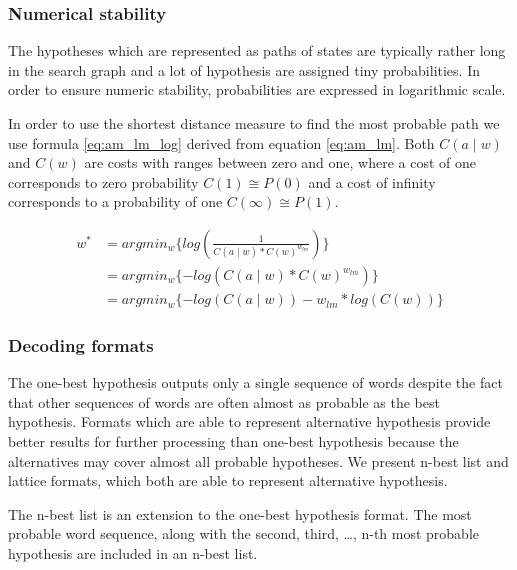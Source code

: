 \subsubsection*{Numerical stability}
The hypotheses which are represented as paths of states are typically rather long in the search graph and a lot of hypothesis are assigned tiny probabilities. In order to ensure numeric stability, probabilities are expressed in logarithmic scale. 


In order to use the shortest distance measure to find the most probable path we use formula \ref{eq:am_lm_log} derived from equation \ref{eq:am_lm}. Both $C(a \mid w)$ and $C(w)$ are costs with ranges between zero and one, where a cost of one corresponds to zero probability $C(1) \cong P(0)$ and a cost of infinity corresponds to a probability of one $C(\infty) \cong P(1)$.

\begin{equation}\label{eq:am_lm_log}
  \begin{split}
    w^* &= argmin_{w}\{log(\frac{1}{C(a \mid w) * C(w)^{w_{lm}}})\} \\
    &= argmin_{w}\{-log(C(a \mid w) * C(w)^{w_{lm}})\} \\
    &= argmin_{w}\{-log(C(a \mid w)) - w_{lm}*log( C(w))\} 
  \end{split}
\end{equation}

\subsubsection*{Decoding formats}
The one-best hypothesis outputs only a single sequence of words despite the fact that other sequences of words are often almost as probable as the best hypothesis. Formats which are able to represent alternative hypothesis provide better results for further processing than one-best hypothesis because the alternatives may cover almost all probable hypotheses. We present n-best list and lattice formats, which both are able to represent alternative hypothesis.


The n-best list is an extension to the one-best hypothesis format. The most probable word sequence, along with the second, third, \ldots, n-th most probable hypothesis are included in an n-best list. 

